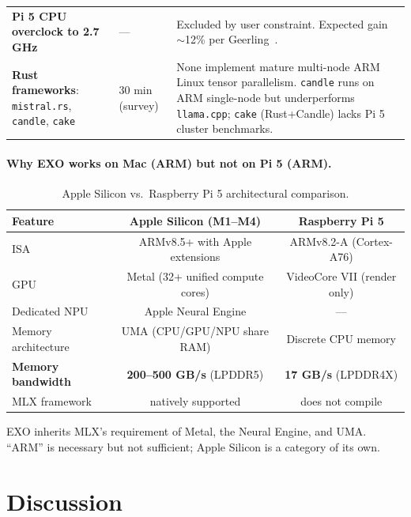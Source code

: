 \documentclass[10pt,a4paper]{article}
\begin{document}
\begin{table}[H]
\begin{tabular}{p{3.5cm}p{2cm}p{9cm}}
\textbf{Pi 5 CPU overclock to 2.7 GHz} & --- & Excluded by user constraint. Expected gain $\sim$12\% per Geerling~\cite{geerling2025}. \\
\textbf{Rust frameworks}: \texttt{mistral.rs}, \texttt{candle}, \texttt{cake} & 30 min (survey) & None implement mature multi-node ARM Linux tensor parallelism. \texttt{candle} runs on ARM single-node but underperforms \texttt{llama.cpp}; \texttt{cake} (Rust+Candle) lacks Pi 5 cluster benchmarks. \\
\bottomrule
\end{tabular}
\end{table}

\paragraph{Why EXO works on Mac (ARM) but not on Pi 5 (ARM).}

\begin{table}[H]
\centering
\caption{Apple Silicon vs.\ Raspberry Pi 5 architectural comparison.}
\begin{tabular}{lcc}
\toprule
\textbf{Feature} & \textbf{Apple Silicon (M1--M4)} & \textbf{Raspberry Pi 5} \\
\midrule
ISA & ARMv8.5+ with Apple extensions & ARMv8.2-A (Cortex-A76) \\
GPU & Metal (32+ unified compute cores) & VideoCore VII (render only) \\
Dedicated NPU & Apple Neural Engine & --- \\
Memory architecture & UMA (CPU/GPU/NPU share RAM) & Discrete CPU memory \\
\textbf{Memory bandwidth} & \textbf{200--500 GB/s} (LPDDR5) & \textbf{17 GB/s} (LPDDR4X) \\
MLX framework & natively supported & does not compile \\
\bottomrule
\end{tabular}
\end{table}

EXO inherits MLX's requirement of Metal, the Neural Engine, and UMA. ``ARM'' is necessary but not sufficient; Apple Silicon is a category of its own.

\section{Discussion}
\end{document}
